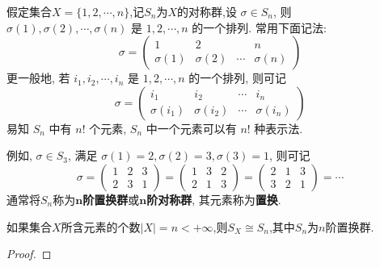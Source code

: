 \documentclass[../../main.tex]{subfiles}%
\begin{document}
\begin{definition}
假定集合\( X = \{1, 2, \cdots, n\} \),记$S_n$为$X$的对称群,设 \( \sigma \in S_n \), 则 \( \sigma(1), \sigma(2), \cdots, \sigma(n) \) 是 \( 1, 2, \cdots, n \) 的一个排列. 常用下面记法:
\[
\sigma = \begin{pmatrix} 1 & 2 & & n \\ \sigma(1) & \sigma(2) & \cdots & \sigma(n) \end{pmatrix}
\]
更一般地, 若 \( i_1, i_2, \cdots, i_n \) 是 \( 1, 2, \cdots, n \) 的一个排列, 则可记
\[
\sigma = \begin{pmatrix} i_1 & i_2 & \cdots & i_n \\ \sigma(i_1) & \sigma(i_2) & \cdots & \sigma(i_n) \end{pmatrix}
\]
易知 \( S_n \) 中有 \( n! \) 个元素, \( S_n \) 中一个元素可以有 \( n! \) 种表示法.

例如, \( \sigma \in S_3 \), 满足 \( \sigma(1) = 2, \sigma(2) = 3, \sigma(3) = 1 \), 则可记
\[
\sigma = \begin{pmatrix} 1 & 2 & 3 \\ 2 & 3 & 1 \end{pmatrix} = \begin{pmatrix} 1 & 3 & 2 \\ 2 & 1 & 3 \end{pmatrix} = \begin{pmatrix} 2 & 1 & 3 \\ 3 & 2 & 1 \end{pmatrix} = \cdots
\]
通常将$S_n$称为$\bm{n}$\textbf{阶置换群}或$\bm{n}$\textbf{阶对称群}, 其元素称为\textbf{置换}.
\end{definition}

\begin{theorem}\label{theorem:n个文字的置换群同构于n阶置换群}
如果集合$X$所含元素的个数\( |X| = n < +\infty \),则$S_X\cong S_n$,其中$S_n$为$n$阶置换群.
\end{theorem}
\begin{proof}

\end{proof}
\end{document}
